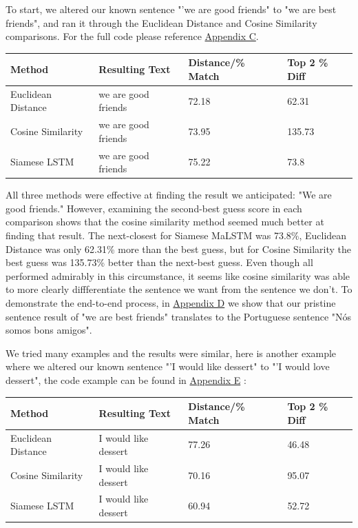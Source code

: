 \documentclass[runningheads]{llncs}
\begin{document}
	To start, we altered our known sentence "'we are good friends" to "we are best friends", and ran it through the Euclidean Distance and Cosine Similarity comparisons. For the full code please reference \hyperlink{Appendix C}{Appendix C}.

\vspace{10 mm}
	\begin{minipage}{\linewidth}
			\begin{tabular}{| l | l | l | l |}
			  \hline			
			  Method & Resulting Text & Distance/\% Match & Top 2 \% Diff \\
			  \hline			
			  Euclidean Distance & we are good friends & 72.18 & 62.31 \\
			  \hline			
			  Cosine Similarity & we are good friends & 73.95 & 135.73 \\
			  \hline  
			  Siamese LSTM & we are good friends & 75.22 & 73.8 \\
			  \hline
			\end{tabular}
	\end{minipage}
	\afterpage{\clearpage}
\vspace{10 mm}

	All three methods were effective at finding the result we anticipated: "We are good friends." However, examining the second-best guess score in each comparison shows that the cosine similarity method seemed much better at finding that result. The next-closest for Siamese MaLSTM was 73.8\%, Euclidean Distance was only 62.31\% more than the best guess, but for Cosine Similarity the best guess was 135.73\% better than the next-best guess. Even though all performed admirably in this circumstance, it seems like cosine similarity was able to more clearly diffferentiate the sentence we want from the sentence we don't.  To demonstrate the end-to-end process, in \hyperlink{Appendix D}{Appendix D} we show that our pristine sentence result of "we are best friends" translates to the Portuguese sentence "Nós somos bons amigos".

	We tried many examples and the results were similar, here is another example where we altered our known sentence "'I would like dessert" to "'I would love dessert", the code example can be found in \hyperlink{Appendix E}{Appendix E} :


\vspace{10 mm}
	\begin{minipage}{\linewidth}
			\begin{tabular}{| l | l | l | l |}
			  \hline			
			  Method & Resulting Text & Distance/\% Match & Top 2 \% Diff \\
			  \hline			
			  Euclidean Distance & I would like dessert & 77.26 & 46.48 \\
			  \hline			
			  Cosine Similarity & I would like dessert & 70.16 & 95.07 \\
			  \hline  
			  Siamese LSTM & I would like dessert & 60.94 & 52.72 \\
			  \hline
			\end{tabular}
	\end{minipage}
	\afterpage{\clearpage}
\vspace{10 mm}
\end{document}
